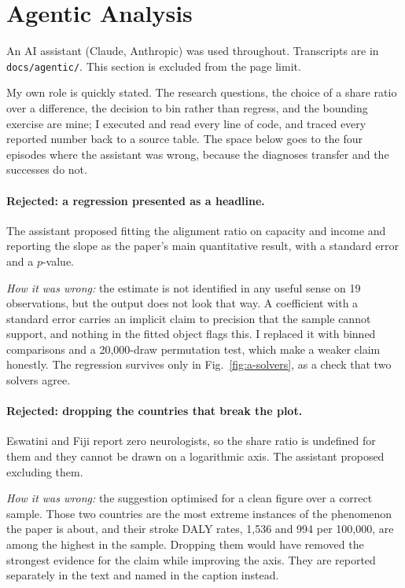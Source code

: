 \documentclass[10pt]{article}
\begin{document}
\section*{Agentic Analysis}

An AI assistant (Claude, Anthropic) was used throughout. Transcripts are in
\texttt{docs/agentic/}. This section is excluded from the page limit.

My own role is quickly stated. The research questions, the choice of a share
ratio over a difference, the decision to bin rather than regress, and the
bounding exercise are mine; I executed and read every line of code, and traced
every reported number back to a source table. The space below goes to the four
episodes where the assistant was wrong, because the diagnoses transfer and the
successes do not.

\paragraph{Rejected: a regression presented as a headline.} The assistant
proposed fitting the alignment ratio on capacity and income and reporting the
slope as the paper's main quantitative result, with a standard error and a
$p$-value.

\emph{How it was wrong:} the estimate is not identified in any useful sense on
19 observations, but the output does not look that way. A coefficient with a
standard error carries an implicit claim to precision that the sample cannot
support, and nothing in the fitted object flags this. I replaced it with binned
comparisons and a 20{,}000-draw permutation test, which make a weaker claim
honestly. The regression survives only in Fig.~\ref{fig:a-solvers}, as a check
that two solvers agree.

\paragraph{Rejected: dropping the countries that break the plot.} Eswatini and
Fiji report zero neurologists, so the share ratio is undefined for them and they
cannot be drawn on a logarithmic axis. The assistant proposed excluding them.

\emph{How it was wrong:} the suggestion optimised for a clean figure over a
correct sample. Those two countries are the most extreme instances of the
phenomenon the paper is about, and their stroke DALY rates, 1{,}536 and 994 per
100{,}000, are among the highest in the sample. Dropping them would have removed
the strongest evidence for the claim while improving the axis. They are reported
separately in the text and named in the caption instead.
\end{document}
